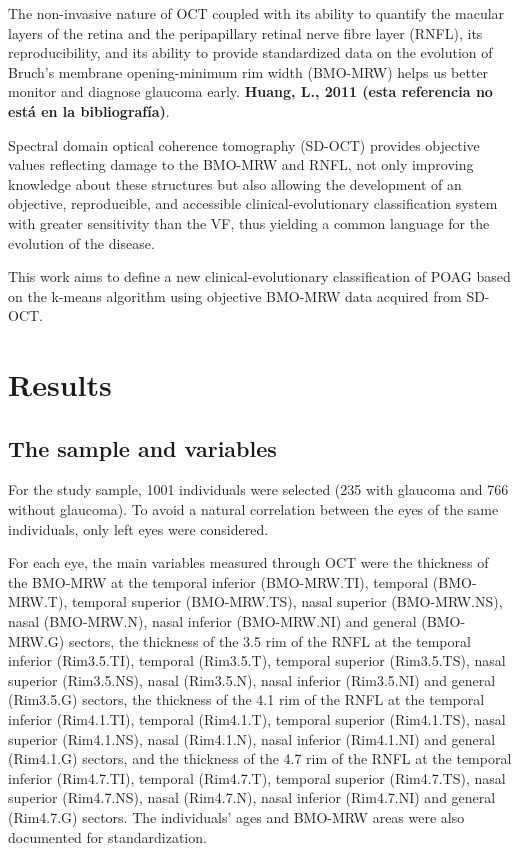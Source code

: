 \documentclass[fleqn,10pt]{wlscirep}
\begin{document}
The non-invasive nature of OCT coupled with its ability to quantify the macular layers of the retina and the peripapillary retinal nerve fibre layer (RNFL), its reproducibility, and its ability to provide standardized data on the evolution of Bruch's membrane opening-minimum rim width (BMO-MRW)\cite{schuman:1995:quantification} helps us better monitor and diagnose glaucoma early\cite{bengtssonb:2012:performance, grewal:2013:diagnostico, lee:2010:reproducibility, toteberg-harms:2012:repeatability}. \textbf{Huang, L., 2011 (esta referencia no está en la bibliografía)}. 

Spectral domain optical coherence tomography (SD-OCT) provides objective values reflecting damage to the BMO-MRW and RNFL, not only improving knowledge about these structures but also allowing the development of an objective, reproducible, and accessible clinical-evolutionary classification system with greater sensitivity than the VF, thus yielding a common language for the evolution of the disease\cite{balwuantray:2013:, zhang:2017:comparison}.

This work aims to define a new clinical-evolutionary classification of POAG based on the k-means algorithm using objective BMO-MRW data acquired from SD-OCT.

\section*{Results}

\subsection*{The sample and variables}

For the study sample, 1001 individuals were selected (235 with glaucoma and 766 without glaucoma). To avoid a natural correlation between the eyes of the same individuals, only left eyes were considered.

For each eye, the main variables measured through OCT were the thickness of the BMO-MRW at the temporal inferior (BMO-MRW.TI), temporal (BMO-MRW.T), temporal superior (BMO-MRW.TS), nasal superior (BMO-MRW.NS), nasal (BMO-MRW.N), nasal inferior (BMO-MRW.NI) and general (BMO-MRW.G) sectors, the thickness of the 3.5 rim of the RNFL at the temporal inferior (Rim3.5.TI), temporal (Rim3.5.T), temporal superior (Rim3.5.TS), nasal superior (Rim3.5.NS), nasal (Rim3.5.N), nasal inferior (Rim3.5.NI) and general (Rim3.5.G) sectors,  the thickness of the 4.1 rim of the RNFL at the temporal inferior (Rim4.1.TI), temporal (Rim4.1.T), temporal superior (Rim4.1.TS), nasal superior (Rim4.1.NS), nasal (Rim4.1.N), nasal inferior (Rim4.1.NI) and general (Rim4.1.G) sectors, and the thickness of the 4.7 rim of the RNFL at the temporal inferior (Rim4.7.TI), temporal (Rim4.7.T), temporal superior (Rim4.7.TS), nasal superior (Rim4.7.NS), nasal (Rim4.7.N), nasal inferior (Rim4.7.NI) and general (Rim4.7.G) sectors. The individuals’ ages and BMO-MRW areas were also documented for standardization.
\end{document}
